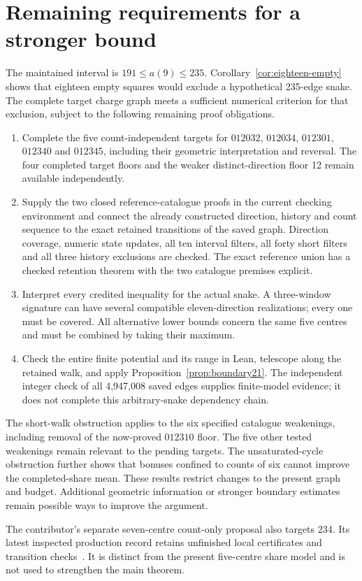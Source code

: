 \section{Remaining requirements for a stronger bound}\label{sec:closure}
The maintained interval is $191\le a(9)\le235$. Corollary~\ref{cor:eighteen-empty}
shows that eighteen empty squares would exclude a hypothetical 235-edge snake.
The complete target charge graph meets a sufficient numerical criterion for
that exclusion, subject to the following remaining proof obligations.
\begin{enumerate}
\item Complete the five count-independent targets for $012032$, $012034$,
$012301$, $012340$ and $012345$, including their geometric interpretation and
reversal. The four completed target floors and the weaker distinct-direction
floor 12 remain available independently.
\item Supply the two closed reference-catalogue proofs in the current checking
environment and connect the already constructed direction, history and count
sequence to the exact retained transitions of the saved graph. Direction
coverage, numeric state updates, all ten interval filters, all forty short
filters and all three history exclusions are checked. The exact reference
union has a checked retention theorem with the two catalogue premises explicit.
\item Interpret every credited inequality for the actual snake. A three-window
signature can have several compatible eleven-direction realizations; every
one must be covered. All alternative lower bounds concern the same five
centres and must be combined by taking their maximum.
\item Check the entire finite potential and its range in Lean, telescope along
the retained walk, and apply Proposition~\ref{prop:boundary21}. The independent
integer check of all 4,947,008 saved edges supplies finite-model evidence;
it does not complete this arbitrary-snake dependency chain.
\end{enumerate}

The short-walk obstruction applies to the six specified catalogue weakenings,
including removal of the now-proved $012310$ floor. The five other tested
weakenings remain relevant to the pending targets. The unsaturated-cycle
obstruction further shows that bonuses confined to counts of six cannot
improve the completed-share mean. These results restrict changes to the
present graph and budget. Additional geometric information or stronger
boundary estimates remain possible ways to improve the argument.

The contributor's separate seven-centre count-only proposal also targets 234.
Its latest inspected production record retains unfinished local certificates
and transition checks~\cite{conditional234archive}. It is distinct from the
present five-centre share model and is not used to strengthen the main theorem.

